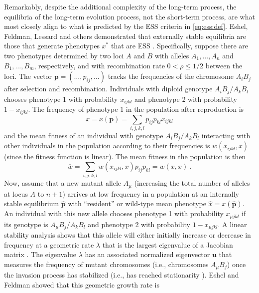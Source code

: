 \documentclass[11pt]{article}
\newcommand{\mean}[1]{\overline{#1}}
\newcommand{\ess}[1]{#1^*}
\newcommand{\fixp}[1]{\hat{#1}}
\renewcommand{\vec}[1]{\symbf{#1}}
\newcommand{\rec}{\rho}
\newcommand{\mut}{\mu}
\newcommand{\eig}{\lambda}
\begin{document}
Remarkably, despite the additional complexity of the long-term process, the equilibria of the long-term evolution process, not the short-term process, are what most closely align to what is predicted by the ESS criteria in \eqref{eq:ess:def}. Eshel, Feldman, Lessard and others demonstrated that externally stable equilibria are those that generate phenotypes $\ess{x}$ that are ESS \cite{Eshel:Feldman:1984,Liberman:1988,Eshel:1996,Hammerstein:Selten:1994,Hammerstein:1996,Weissing:1996,Eshel:Feldman:1998}. Specifically, suppose there are two phenotypes determined by two loci $A$ and $B$ with alleles $A_{1},\ldots,A_{n}$ and $B_{1},\ldots,B_{m}$, respectively, and with recombination rate $0<\rec\le1/2$ between the loci. The vector $\vec{p} = (\ldots,p_{ij},\ldots)$ tracks the frequencies of the chromosome $A_{i} B_{j}$ after selection and recombination. Individuals with diploid genotype $A_{i}B_{j}/A_{k}B_{l}$ chooses phenotype 1 with probability $x_{ijkl}$ and phenotype 2 with probability $1 - x_{ijkl}$. The frequency of phenotype 1 in the population after reproduction is
\begin{equation*}
  x = x(\vec{p}) = \sum_{i,j,k,l} p_{ij} p_{kl} x_{ijkl}
\end{equation*}
and the mean fitness of an individual with genotype $A_{i}B_{j}/A_{k}B_{l}$ interacting with other individuals in the population according to their frequencies is $w(x_{ijkl}, x)$ (since the fitness function is linear). The mean fitness in the population is then
\begin{equation*}
  \mean{w} = \sum_{i,j,k,l} w(x_{ijkl}, x) p_{ij} p_{kl} = w(x, x) \: .
\end{equation*}
Now, assume that a new mutant allele $A_{\mut}$ (increasing the total number of alleles at locus $A$ to $n+1$) arrives at low frequency in a population at an internally stable equilibrium $\fixp{\vec{p}}$ with ``resident'' or wild-type mean phenotype $\fixp{x} = x(\fixp{\vec{p}})$. An individual with this new allele chooses phenotype 1 with probability $x_{\mut jkl}$ if its genotype is $A_{\mut}B_{j}/A_{k}B_{l}$ and phenotype 2 with probability $1 - x_{\mut jkl}$. A linear stability analysis shows that this allele will either initially increase or decrease in frequency at a geometric rate $\eig$ that is the largest eigenvalue of a Jacobian matrix \cite{Edelstein-Keshet:2005}. The eigenvalue $\eig$ has an associated normalized eigenvector $\vec{u}$ that measures the frequency of mutant chromosomes (i.e., chromosomes $A_{\mut} B_{j}$) once the invasion process has stabilized (i.e., has reached stationarity \cite{Caswell:2006}). Eshel and Feldman \cite{Eshel:Feldman:1984,Eshel:Feldman:1998} showed that this geometric growth rate is
\end{document}
